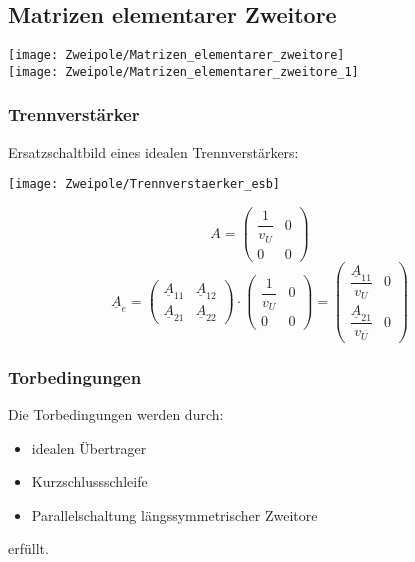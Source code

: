 \clearpage
\begin{samepage}
    \subsection{Matrizen elementarer Zweitore}
    \begin{center}
        \texttt{[image: Zweipole/Matrizen\_elementarer\_zweitore]}\\
        \texttt{[image: Zweipole/Matrizen\_elementarer\_zweitore\_1]}
    \end{center}
\end{samepage}
\clearpage

\subsubsection{Trennverst\"arker}
\begin{mdframed}[style=exercise]
Ersatzschaltbild eines idealen Trennverst\"arkers:
    \begin{center}
        \texttt{[image: Zweipole/Trennverstaerker\_esb]}
    \end{center}
    \[
        A = \begin{pmatrix}
            \dfrac{1}{v_U} & 0 \\
                  0        & 0
        \end{pmatrix}
    \]
    \[
        \underline{A}_e = \begin{pmatrix}
            \underline{A}_{11} & \underline{A}_{12}\\
            \underline{A}_{21} & \underline{A}_{22}
        \end{pmatrix}
        \cdot
        \begin{pmatrix}
            \dfrac{1}{v_U} & 0 \\
                  0        & 0
        \end{pmatrix}
        = \begin{pmatrix}
            \dfrac{\underline{A}_{11}}{v_U} & 0\\
            \dfrac{\underline{A}_{21}}{v_U} & 0
        \end{pmatrix}
    \]
\end{mdframed}

\subsubsection{Torbedingungen}
Die Torbedingungen werden durch:
    \begin{itemize}
        \item idealen \"Ubertrager
        \item Kurzschlussschleife
        \item Parallelschaltung längssymmetrischer Zweitore
    \end{itemize} erf\"ullt.


